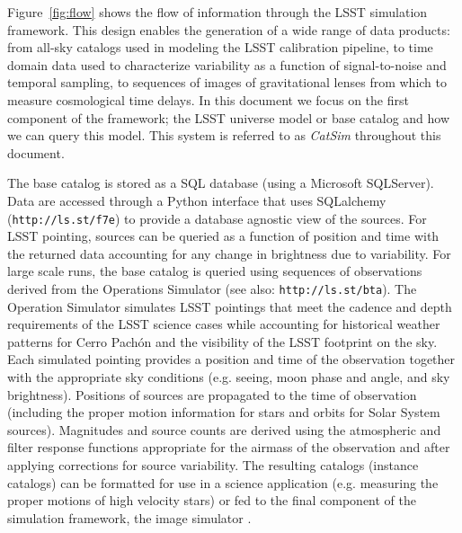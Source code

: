 \documentclass[11pt]{article}
\begin{document}
Figure~\ref{fig:flow} shows the flow of information through the LSST
simulation framework.
This design enables the generation of a wide range of data products:
from all-sky catalogs used in modeling the LSST calibration pipeline,
to time domain data used to characterize variability as a function of
signal-to-noise and temporal sampling, to sequences of images of
gravitational lenses from which to measure cosmological time delays.
In this document we focus on the first component of the framework; the
LSST universe model or base catalog and how we can query this
model. This system is referred to as {\it CatSim} throughout this
document.

The base catalog is stored as a SQL database (using a Microsoft
SQLServer). Data are accessed through a Python interface that uses
SQLalchemy ({\tt http://ls.st/f7e}) to provide a database
agnostic view of the sources. For LSST pointing, sources can be
queried as a function of position and time with the returned data
accounting for any change in brightness due to variability. For large
scale runs, the base catalog is queried using sequences of
observations derived from the Operations Simulator \citep{cook09} (see
also: {\tt http://ls.st/bta}).  The Operation Simulator
simulates LSST pointings that meet the cadence and depth requirements
of the LSST science cases while accounting for historical weather
patterns for Cerro Pach\'{o}n and the visibility of the LSST footprint on
the sky. Each simulated pointing provides a position and time of the
observation together with the appropriate sky conditions (e.g. seeing,
moon phase and angle, and sky brightness). Positions of sources are
propagated to the time of observation (including the proper motion
information for stars and orbits for Solar System sources). Magnitudes
and source counts are derived using the atmospheric and filter
response functions appropriate for the airmass of the observation and
after applying corrections for source variability. The resulting
catalogs (instance catalogs) can be formatted for use in a science
application (e.g. measuring the proper motions of high velocity stars)
or fed to the final component of the simulation framework, the image
simulator \citep{phosim}.
\end{document}
